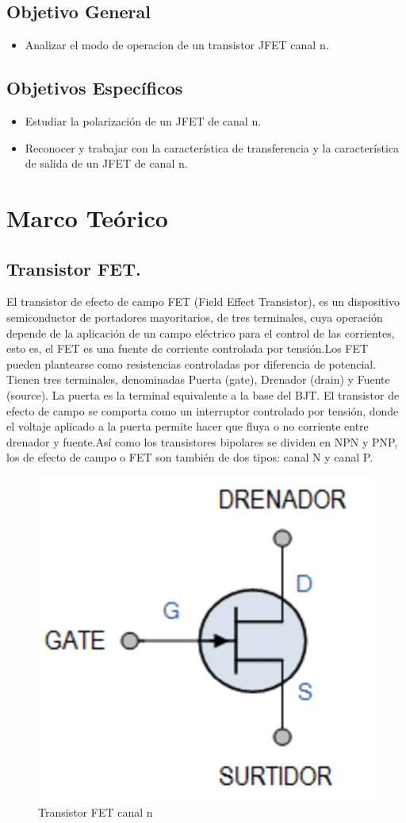 \documentclass[12pt, a4paper]{article}
\begin{document}
    \subsection{Objetivo General}
    \begin{itemize}
        \item Analizar el modo de operacion de un transistor JFET canal n. 
    \end{itemize}

    \subsection{Objetivos Específicos}
    \begin{itemize}
        \item Estudiar la polarización de un JFET de canal n.
        \item Reconocer y trabajar con la característica de transferencia y la característica de salida de un JFET de canal n.
    \end{itemize}

    \newpage

    \section{Marco Teórico}

    \subsection{Transistor FET.}

    El transistor de efecto de campo FET (Field Effect Transistor), es un dispositivo semiconductor de portadores mayoritarios, de tres terminales, cuya operación depende de la aplicación de un campo eléctrico para el control de las corrientes, esto es, el FET es una fuente de corriente controlada por tensión.Los FET pueden plantearse como resistencias controladas por diferencia de potencial. Tienen tres terminales, denominadas Puerta (gate), Drenador (drain) y Fuente (source). La puerta es la terminal equivalente a la base del BJT. El transistor de efecto de campo se comporta como un interruptor controlado por tensión, donde el voltaje aplicado a la puerta permite hacer que fluya o no corriente entre drenador y fuente.Así como los transistores bipolares se dividen en NPN y PNP, los de efecto de campo o FET son también de dos tipos: canal N y canal P.

    \begin{figure}[h!]
        \centering
        \includegraphics[height=5cm\textwidth]{fetn.jpg}
        \caption{Transistor FET canal n}
        \label{fig:t1}
    \end{figure}
\end{document}
